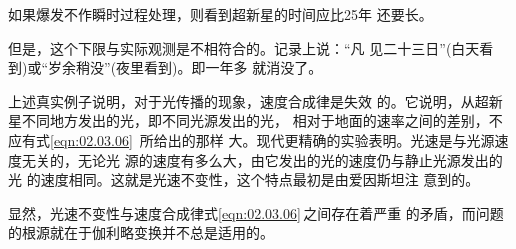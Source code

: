 如果爆发不作瞬时过程处理，则看到超新星的时间应比25年
还要长。

但是，这个下限与实际观测是不相符合的。记录上说：“凡
见二十三日”(白天看到)或“岁余稍没”(夜里看到)。即一年多
就消没了。

上述真实例子说明，对于光传播的现象，速度合成律是失效
的。它说明，从超新星不同地方发出的光，即不同光源发出的光，
相对于地面的速率之间的差别，不应有式\eqref{eqn:02.03.06}~所给出的那样
大。现代更精确的实验表明。光速是与光源速度无关的，无论光
源的速度有多么大，由它发出的光的速度仍与静止光源发出的光
的速度相同。这就是光速不变性，这个特点最初是由爱因斯坦注
意到的。

显然，光速不变性与速度合成律\lbr 式\eqref{eqn:02.03.06}\,\rbr 之间存在着严重
的矛盾，而问题的根源就在于伽利略变换并不总是适用的。